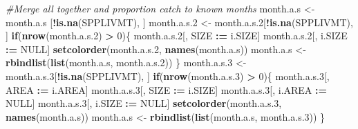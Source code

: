 \documentclass[]{article}
\newenvironment{Shaded}{\begin{snugshade}}{\end{snugshade}}
\newcommand{\KeywordTok}[1]{\textcolor[rgb]{0.13,0.29,0.53}{\textbf{#1}}}
\newcommand{\DecValTok}[1]{\textcolor[rgb]{0.00,0.00,0.81}{#1}}
\newcommand{\StringTok}[1]{\textcolor[rgb]{0.31,0.60,0.02}{#1}}
\newcommand{\CommentTok}[1]{\textcolor[rgb]{0.56,0.35,0.01}{\textit{#1}}}
\newcommand{\OtherTok}[1]{\textcolor[rgb]{0.56,0.35,0.01}{#1}}
\newcommand{\ControlFlowTok}[1]{\textcolor[rgb]{0.13,0.29,0.53}{\textbf{#1}}}
\newcommand{\OperatorTok}[1]{\textcolor[rgb]{0.81,0.36,0.00}{\textbf{#1}}}
\newcommand{\ErrorTok}[1]{\textcolor[rgb]{0.64,0.00,0.00}{\textbf{#1}}}
\newcommand{\NormalTok}[1]{#1}
\begin{document}
\begin{Shaded}
\begin{Highlighting}[]
  \CommentTok{#Merge all together and proportion catch to known months}
\NormalTok{  month.a.s   <-}\StringTok{ }\NormalTok{month.a.s  [}\OperatorTok{!}\KeywordTok{is.na}\NormalTok{(SPPLIVMT), ]}
\NormalTok{  month.a.s.}\DecValTok{2}\NormalTok{ <-}\StringTok{ }\NormalTok{month.a.s.}\DecValTok{2}\NormalTok{[}\OperatorTok{!}\KeywordTok{is.na}\NormalTok{(SPPLIVMT), ]}
  \ControlFlowTok{if}\NormalTok{(}\KeywordTok{nrow}\NormalTok{(month.a.s.}\DecValTok{2}\NormalTok{) }\OperatorTok{>}\StringTok{ }\DecValTok{0}\NormalTok{)\{}
\NormalTok{    month.a.s.}\DecValTok{2}\NormalTok{[, SIZE   }\OperatorTok{:}\ErrorTok{=}\StringTok{ }\NormalTok{i.SIZE]}
\NormalTok{    month.a.s.}\DecValTok{2}\NormalTok{[, i.SIZE }\OperatorTok{:}\ErrorTok{=}\StringTok{ }\OtherTok{NULL}\NormalTok{]}
    \KeywordTok{setcolorder}\NormalTok{(month.a.s.}\DecValTok{2}\NormalTok{, }\KeywordTok{names}\NormalTok{(month.a.s))}
\NormalTok{    month.a.s <-}\StringTok{ }\KeywordTok{rbindlist}\NormalTok{(}\KeywordTok{list}\NormalTok{(month.a.s, month.a.s.}\DecValTok{2}\NormalTok{))}
\NormalTok{  \}}
\NormalTok{  month.a.s.}\DecValTok{3}\NormalTok{ <-}\StringTok{ }\NormalTok{month.a.s.}\DecValTok{3}\NormalTok{[}\OperatorTok{!}\KeywordTok{is.na}\NormalTok{(SPPLIVMT), ]}
  \ControlFlowTok{if}\NormalTok{(}\KeywordTok{nrow}\NormalTok{(month.a.s.}\DecValTok{3}\NormalTok{) }\OperatorTok{>}\StringTok{ }\DecValTok{0}\NormalTok{)\{}
\NormalTok{    month.a.s.}\DecValTok{3}\NormalTok{[, AREA   }\OperatorTok{:}\ErrorTok{=}\StringTok{ }\NormalTok{i.AREA]}
\NormalTok{    month.a.s.}\DecValTok{3}\NormalTok{[, SIZE   }\OperatorTok{:}\ErrorTok{=}\StringTok{ }\NormalTok{i.SIZE]}
\NormalTok{    month.a.s.}\DecValTok{3}\NormalTok{[, i.AREA }\OperatorTok{:}\ErrorTok{=}\StringTok{ }\OtherTok{NULL}\NormalTok{]}
\NormalTok{    month.a.s.}\DecValTok{3}\NormalTok{[, i.SIZE }\OperatorTok{:}\ErrorTok{=}\StringTok{ }\OtherTok{NULL}\NormalTok{]}
    \KeywordTok{setcolorder}\NormalTok{(month.a.s.}\DecValTok{3}\NormalTok{, }\KeywordTok{names}\NormalTok{(month.a.s))}
\NormalTok{    month.a.s <-}\StringTok{ }\KeywordTok{rbindlist}\NormalTok{(}\KeywordTok{list}\NormalTok{(month.a.s, month.a.s.}\DecValTok{3}\NormalTok{))  }
\NormalTok{  \}}
  

\end{Highlighting}
\end{Shaded}
\end{document}
